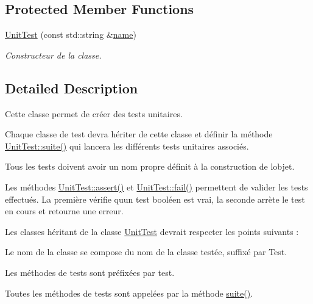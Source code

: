 \subsection*{Protected Member Functions}
\begin{DoxyCompactItemize}
\item 
\mbox{\label{classUnitTest_aefa94b0ad902a2e8ccff1f0441cafbff}} 
\hyperlink{classUnitTest_aefa94b0ad902a2e8ccff1f0441cafbff}{Unit\+Test} (const std\+::string \&\hyperlink{classUnitTest_a6582f12faa929906359112ac916263ea}{name})
\begin{DoxyCompactList}\small\item\em Constructeur de la classe. \end{DoxyCompactList}\end{DoxyCompactItemize}


\subsection{Detailed Description}
Cette classe permet de créer des tests unitaires. 

Chaque classe de test devra hériter de cette classe et définir la méthode \hyperlink{classUnitTest_a15eae3e23414a5877c8652655dd88c3f}{Unit\+Test\+::suite()} qui lancera les différents tests unitaires associés.

Tous les tests doivent avoir un nom propre définit à la construction de l\textquotesingle{}objet.

Les méthodes \hyperlink{classUnitTest_a94aab90579073ba6e2068bbc05c47c4a}{Unit\+Test\+::assert()} et \hyperlink{classUnitTest_aae657d6d8bdc56cb2a9d4e4e9f5f8929}{Unit\+Test\+::fail()} permettent de valider les tests effectués. La première vérifie qu\textquotesingle{}un test booléen est vrai, la seconde arrète le test en cours et retourne une erreur.

Les classes héritant de la classe {\ttfamily \hyperlink{classUnitTest}{Unit\+Test}} devrait respecter les points suivants \+:
\begin{DoxyItemize}
\item Le nom de la classe se compose du nom de la classe testée, suffixé par {\ttfamily Test}.
\item Les méthodes de tests sont préfixées par {\ttfamily test}.
\item Toutes les méthodes de tests sont appelées par la méthode {\ttfamily \hyperlink{classUnitTest_a15eae3e23414a5877c8652655dd88c3f}{suite()}}. 
\end{DoxyItemize}


